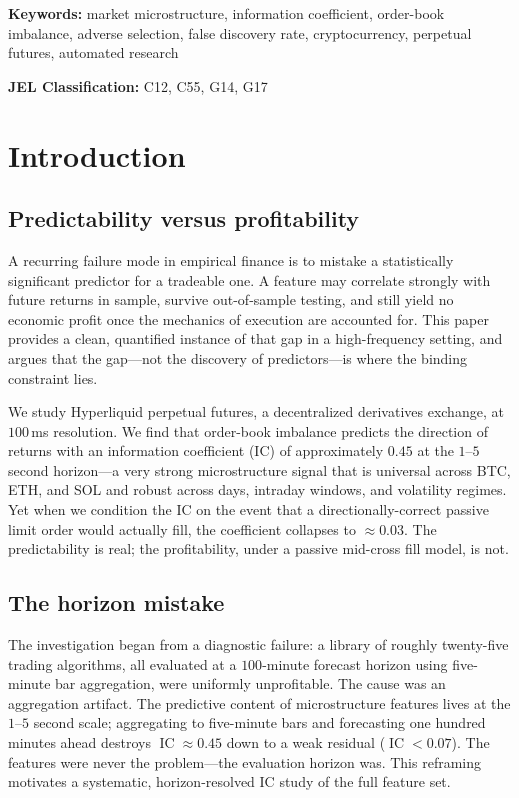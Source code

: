 \documentclass[11pt,a4paper]{article}
\theoremstyle{definition}
\theoremstyle{plain}
\DeclareMathOperator{\IC}{IC}
\begin{document}
\smallskip
\noindent\textbf{Keywords:} market microstructure, information coefficient, order-book imbalance,
adverse selection, false discovery rate, cryptocurrency, perpetual futures, automated research

\smallskip
\noindent\textbf{JEL Classification:} C12, C55, G14, G17

\tableofcontents
\bigskip

\section{Introduction}
\label{sec:intro}

\subsection{Predictability versus profitability}

A recurring failure mode in empirical finance is to mistake a statistically significant
predictor for a tradeable one. A feature may correlate strongly with future returns in sample,
survive out-of-sample testing, and still yield no economic profit once the mechanics of
execution are accounted for. This paper provides a clean, quantified instance of that gap in a
high-frequency setting, and argues that the gap---not the discovery of predictors---is where the
binding constraint lies.

We study Hyperliquid perpetual futures, a decentralized derivatives exchange, at $100$\,ms
resolution. We find that order-book imbalance predicts the direction of returns with an
information coefficient (IC) of approximately $0.45$ at the $1$--$5$ second horizon---a very
strong microstructure signal that is universal across BTC, ETH, and SOL and robust across days,
intraday windows, and volatility regimes. Yet when we condition the IC on the event that a
directionally-correct passive limit order would actually fill, the coefficient collapses to
$\approx 0.03$. The predictability is real; the profitability, under a passive mid-cross fill
model, is not.

\subsection{The horizon mistake}

The investigation began from a diagnostic failure: a library of roughly twenty-five trading
algorithms, all evaluated at a $100$-minute forecast horizon using five-minute bar aggregation,
were uniformly unprofitable. The cause was an aggregation artifact. The predictive content of
microstructure features lives at the $1$--$5$ second scale; aggregating to five-minute bars and
forecasting one hundred minutes ahead destroys $\IC\approx 0.45$ down to a weak residual
($\IC<0.07$). The features were never the problem---the evaluation horizon was. This reframing
motivates a systematic, horizon-resolved IC study of the full feature set.
\end{document}
